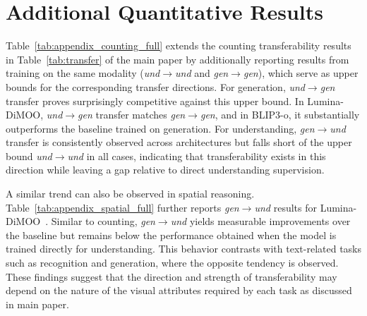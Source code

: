 \clearpage
\section{Additional Quantitative Results}



Table~\ref{tab:appendix_counting_full} extends the counting transferability results in Table~\ref{tab:transfer} of the main paper by additionally reporting results from training on the same modality (\textit{und}$\rightarrow$\textit{und} and \textit{gen}$\rightarrow$\textit{gen}), which serve as upper bounds for the corresponding transfer directions. For generation, \textit{und}$\rightarrow$\textit{gen} transfer proves surprisingly competitive against this upper bound. In Lumina-DiMOO, \textit{und}$\rightarrow$\textit{gen} transfer matches \textit{gen}$\rightarrow$\textit{gen}, and in BLIP3-o, it substantially outperforms the baseline trained on generation. For understanding, \textit{gen}$\rightarrow$\textit{und} transfer is consistently observed across architectures but falls short of the upper bound \textit{und}$\rightarrow$\textit{und} in all cases, indicating that transferability exists in this direction while leaving a gap relative to direct understanding supervision.

A similar trend can also be observed in spatial reasoning. Table~\ref{tab:appendix_spatial_full} further reports \textit{gen}$\rightarrow$\textit{und} results for Lumina-DiMOO~\cite{xin2025lumina}. Similar to counting, \textit{gen}$\rightarrow$\textit{und} yields measurable improvements over the baseline but remains below the performance obtained when the model is trained directly for understanding. This behavior contrasts with text-related tasks such as recognition and generation, where the opposite tendency is observed. These findings suggest that the direction and strength of transferability may depend on the nature of the visual attributes required by each task as discussed in main paper.



